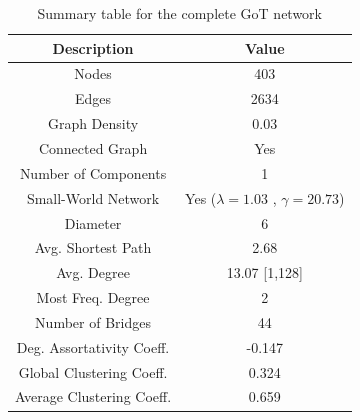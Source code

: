 \documentclass[10pt,twocolumn,letterpaper]{article}
\begin{document}
\begin{table}[!h]
    \centering
    \small
    \begin{tabular}{c|c}
        Description & Value  \\
        \hline
        Nodes & 403\\
        Edges & 2634 \\
        Graph Density & 0.03 \\
        Connected Graph & Yes \\
        Number of Components & 1 \\
        Small-World Network & Yes ($\lambda=1.03$ , $\gamma=20.73$) \\
        Diameter & 6 \\
        Avg. Shortest Path & 2.68 \\
        Avg. Degree & 13.07 [1,128] \\
        Most Freq. Degree & 2 \\
        Number of Bridges & 44 \\
        Deg. Assortativity Coeff. & -0.147\\
        Global Clustering Coeff. & 0.324 \\
        Average Clustering Coeff. & 0.659 \\
        \hline 
    \end{tabular}
    \vspace{0.2cm}
    \caption{Summary table for the complete GoT network}
    \label{tab:my_label}
\end{table} 
\end{document}

